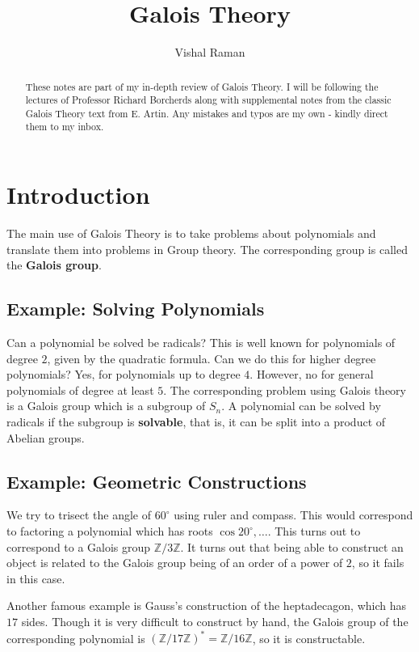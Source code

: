\documentclass[11pt]{scrartcl}
\newcommand{\Z}{\mathbb{Z}}
\begin{document}
\title{Galois Theory}
\author{Vishal Raman}
\maketitle
\begin{abstract}
These notes are part of my in-depth review of Galois Theory.  I will be following the lectures of Professor Richard Borcherds along with supplemental notes from the classic Galois Theory text from E. Artin.  Any mistakes and typos are my own - kindly direct them to my inbox.
\end{abstract}
\tableofcontents
\pagebreak
\section{Introduction}
The main use of Galois Theory is to take problems about polynomials and translate them into problems in Group theory.  The corresponding group is called the \textbf{Galois group}.

\subsection{Example: Solving Polynomials}
Can a polynomial be solved be radicals?  This is well known for polynomials of degree $2$, given by the quadratic formula.  Can we do this for higher degree polynomials?  Yes,  for polynomials up to degree $4$.  However, no for general polynomials of degree at least $5$.  The corresponding problem using Galois theory is a Galois group which is a subgroup of $S_n$.  A polynomial can be solved by radicals if the subgroup is \textbf{solvable}, that is, it can be split into a product of Abelian groups.

\subsection{Example: Geometric Constructions}
We try to trisect the angle of $60^\circ$ using ruler and compass.  This would correspond to factoring a polynomial which has roots $\cos 20^\circ, \dots$.  This turns out to correspond to a Galois group $\Z/3\Z$.  It turns out that being able to construct an object is related to the Galois group being of an order of a power of $2$, so it fails in this case.

Another famous example is Gauss's construction of the heptadecagon, which has $17$ sides.  Though it is very difficult to construct by hand, the Galois group of the corresponding polynomial is $(\Z/17\Z)^* = \Z/16\Z$, so it is constructable.  
\end{document}
